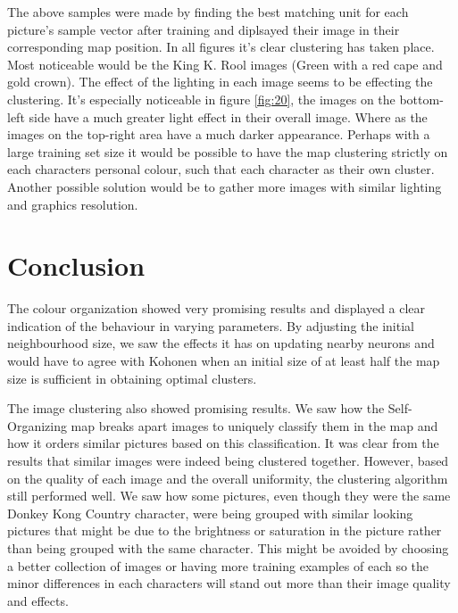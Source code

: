 \documentclass{IEEEtran}
\begin{document}
The above samples were made by finding the best matching unit for each picture's sample vector after training and diplsayed their image in their corresponding map position. In all figures it's clear clustering has taken place.
Most noticeable would be the King K. Rool images (Green with a red cape and gold crown).  
The effect of the lighting in each image seems to be effecting the clustering. It's especially noticeable in figure \ref{fig:20}, the images on the bottom-left side have a much greater light effect in their overall image. Where as the images on the top-right area have a much darker appearance. 
Perhaps with a large training set size it would be possible to have the map clustering strictly on each characters personal colour, such that each character as their own cluster. Another possible solution would be to gather more images with similar lighting and graphics resolution.

\section{Conclusion}
The colour organization showed very promising results and displayed a clear indication of the behaviour in varying parameters. By adjusting the initial neighbourhood size, we saw the effects it has on updating nearby neurons and would have to agree with Kohonen \cite{thesom} when an initial size of at least half the map size is sufficient in obtaining optimal clusters.

The image clustering also showed promising results. We saw how the Self-Organizing map breaks apart images to uniquely classify them in the map and how it orders similar pictures based on this classification. It was clear from the results that similar images were indeed being clustered together. However, based on the quality of each image and the overall uniformity, the clustering algorithm still performed well. We saw how some pictures, even though they were the same Donkey Kong Country character, were being  grouped with similar looking pictures that might be due to the brightness or saturation in the picture rather than being grouped with the same character. This might be avoided by choosing a better collection of images or having more training examples of each so the minor differences in each characters will stand out more than their image quality and effects. 




\end{document}
